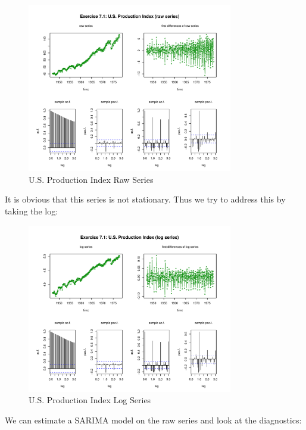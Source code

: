 \begin{figure}[H]
\centering
\includegraphics[width=0.8\textwidth]{plots/UsProdRaw.pdf}
\caption{U.S. Production Index Raw Series}
\end{figure}

It is obvious that this series is not stationary. Thus we try to address this by taking the log:

\begin{figure}[H]
\centering
\includegraphics[width=0.8\textwidth]{plots/UsProdRawLog.pdf}
\caption{U.S. Production Index Log Series}
\end{figure}

We can estimate a SARIMA model on the raw series and look at the diagnostics:

